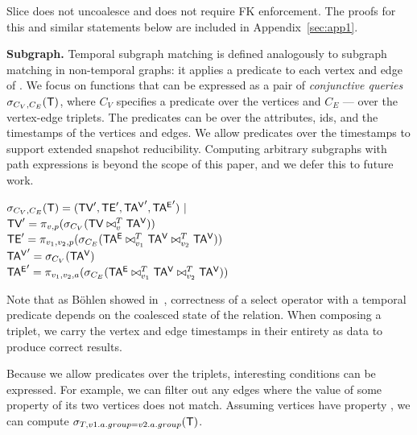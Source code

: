 
Slice does not uncoalesce and does not require FK enforcement.  The
proofs for this and similar statements below are included in
Appendix~\ref{sec:app1}.


{\bf Subgraph.}  Temporal subgraph matching is defined analogously to
subgraph matching in non-temporal graphs: it applies a predicate to
each vertex and edge of \tg.  We focus on functions that can be
expressed as a pair of {\em conjunctive queries} $\sigma_{C_V,C_E}
(\mathsf{T})$, where $C_V$ specifies a predicate over the vertices and $C_E$
--- over the vertex-edge triplets.  The predicates can be over the
attributes, ids, and the timestamps of the vertices and edges.  We
allow predicates over the timestamps to support extended snapshot
reducibility.  Computing arbitrary subgraphs with path expressions is
beyond the scope of this paper, and we defer this to future work.

$\sigma_{C_V,C_E} (\mathsf{T}) = (\textsf{TV}',\textsf{TE}',\mathsf{TA^{V}}',\mathsf{TA^{E}}') ~|~$ \\
$\textsf{TV}' = \pi_{v,p} (\sigma_{C_V} ( \textsf{TV} \bowtie^T_v \mathsf{TA^{V}}))$ \\
$\textsf{TE}' = \pi_{v_1,v_2,p} (\sigma_{C_E} ( \mathsf{TA^{E}} \bowtie^T_{v_1} \mathsf{TA^{V}} \bowtie^T_{v_2} \mathsf{TA^{V}}))$ \\
$\mathsf{TA^{V}}' = \sigma_{C_V} (\mathsf{TA^{V}})$ \\
$\mathsf{TA^{E}}' = \pi_{v_1,v_2,a} (\sigma_{C_E} (\mathsf{TA^{E}} \bowtie^T_{v_1} \mathsf{TA^{V}} \bowtie^T_{v_2} \mathsf{TA^{V}}))$

Note that as B{\"{o}}hlen showed in~\cite{DBLP:reference/db/Bohlen09},
correctness of a select operator with a temporal predicate depends on
the coalesced state of the relation.  When composing a triplet, we
carry the vertex and edge timestamps in their entirety as data to
produce correct results.

Because we allow predicates over the triplets, interesting conditions
can be expressed.  For example, we can filter out any edges where the
value of some property of its two vertices does not match.  Assuming
vertices have property , we can compute
$\sigma_{T,v1.a.group=v2.a.group}(\mathsf{T})$.

